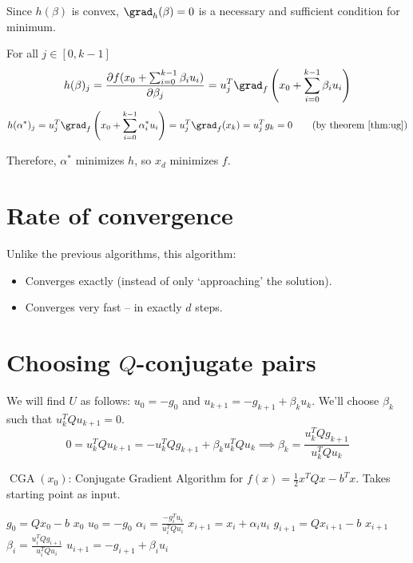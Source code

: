 Since $h(\beta)$ is convex, $\grad_h(\beta) = 0$ is a necessary and sufficient condition for minimum.

For all $j \in [0, k-1]$
\[ h(\beta)_j = \frac{\partial f(x_0 + \sum_{i=0}^{k-1} \beta_i u_i)}{\partial \beta_j}
= u_j^T \grad_f\left(x_0 + \sum_{i=0}^{k-1} \beta_i u_i \right) \]
\[ h(\alpha^*)_j = u_j^T \grad_f\left(x_0 + \sum_{i=0}^{k-1} \alpha_i^* u_i \right)
= u_j^T \grad_f(x_k) = u_j^Tg_k = 0 \tag{by theorem \ref{thm:ug}} \]

Therefore, $\alpha^*$ minimizes $h$, so $x_d$ minimizes $f$.

\section{Rate of convergence}

Unlike the previous algorithms, this algorithm:
\begin{itemize}
\item Converges exactly (instead of only `approaching' the solution).
\item Converges very fast -- in exactly $d$ steps.
\end{itemize}

\section{Choosing \texorpdfstring{$Q$}{Q}-conjugate pairs}

We will find $U$ as follows:
$u_0 = -g_0$ and $u_{k+1} = -g_{k+1} + \beta_k u_k$.
We'll choose $\beta_k$ such that $u_k^TQu_{k+1} = 0$.
\[ 0 = u_k^TQu_{k+1} = -u_k^TQg_{k+1} + \beta_k u_k^TQu_k
\implies \beta_k = \frac{u_k^TQg_{k+1}}{u_k^TQu_k} \]

\begin{algorithm}[H]
\caption{$\operatorname{CGA}(x_0)$: Conjugate Gradient Algorithm for
$f(x) = \frac{1}{2}x^TQx - b^Tx$. Takes starting point as input.}
\label{alg:conj-grad-for-quadratic}
\begin{algorithmic}[1]
\State $g_0 = Qx_0 - b$
    \State \Return $x_0$
\EndIf
\State $u_0 = -g_0$
\For{$i \in [0, \infty)$}
    \State $\displaystyle \alpha_i = \frac{-g_i^Tu_i}{u_i^TQu_i}$
    \State $x_{i+1} = x_i + \alpha_iu_i$
    \State $g_{i+1} = Qx_{i+1} - b$
        \State \Return $x_{i+1}$
    \EndIf
    \State $\displaystyle \beta_i = \frac{u_i^TQg_{i+1}}{u_i^TQu_i}$
    \State $u_{i+1} = -g_{i+1} + \beta_iu_i$
\EndFor
\end{algorithmic}
\end{algorithm}

